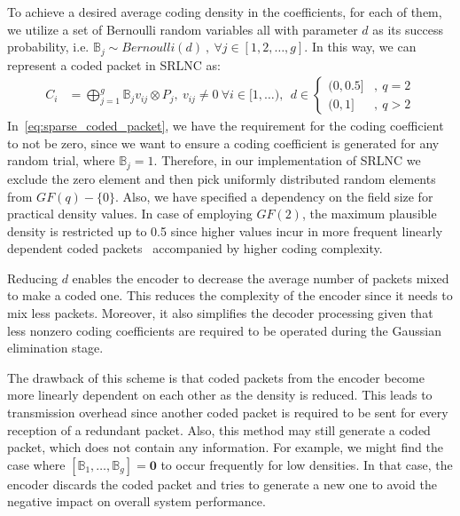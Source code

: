 
To achieve a desired average coding density in the coefficients, for each
of them, we utilize a set of Bernoulli random variables all with parameter
$d$ as its success probability, i.e. $\mathbb{B}_j \sim Bernoulli(d)\ ,\ \forall
j \in [1,2,\ldots,g]$. In this way, we can represent a coded packet in \ac{SRLNC} as:
%
\begin{align} \label{eq:sparse_coded_packet}
    C_i  &= \bigoplus_{j=1}^{g} \mathbb{B}_j v_{ij} \otimes P_j ,\ v_{ij}
    \neq 0\
    \forall i \in [1,\ldots) ,\ \
    d \in
    \begin{cases}
        {(0,0.5]} & ,\ q = 2 \\
        {(0,1]}   & ,\ q > 2
    \end{cases}
\end{align}
%
In~\eqref{eq:sparse_coded_packet}, we have the requirement for the
coding coefficient to not be zero, since we want to ensure a coding
coefficient is generated for any random trial, where
$\mathbb{B}_j = 1$. Therefore, in our implementation of \ac{SRLNC} we
exclude the zero element and then pick uniformly distributed random
elements from $GF(q)-\{ 0 \}$. Also, we have specified a dependency on
the field size for practical density values. In case of employing
$GF(2)$, the maximum plausible density is restricted up to 0.5 since
higher values incur in more frequent linearly dependent coded
packets~\cite{realworld_nc2013} accompanied by higher coding complexity.

Reducing $d$ enables the encoder to decrease the average number of
packets mixed to make a coded one. This reduces the complexity
of the encoder since it needs to mix less packets. Moreover, it also
simplifies the decoder processing given that less nonzero coding
coefficients are required to be operated during the Gaussian
elimination stage.

The drawback of this scheme is that coded packets from the encoder
become more linearly dependent on each other as the density is reduced.  This
leads to transmission overhead since another coded packet is required
to be sent for every reception of a redundant packet.  Also, this
method may still generate a coded packet, which does not contain any
information. For example, we might find the case where
$\left[\mathbb{B}_1, \ldots, \mathbb{B}_g \right] = \mathbf{0}$ to occur
frequently for low densities. In that case, the encoder
discards the coded packet and tries to generate a new one to avoid the
negative impact on overall system performance.

